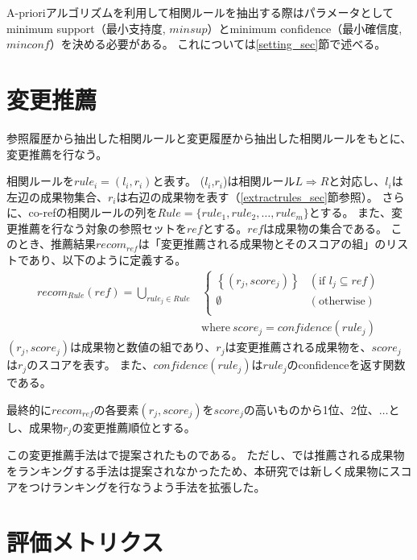 \documentclass[a4paper]{jsbook}
\def\Ra{\Rightarrow}
\newcommand{\minconf}{mincon\!f}
\newcommand{\confidence}{con\!f\!idence}
\begin{document}
A-prioriアルゴリズムを利用して相関ルールを抽出する際はパラメータとしてminimum support（最小支持度, $minsup$）とminimum confidence（最小確信度, $\minconf$）を決める必要がある。
これについては\ref{setting_sec}節で述べる。

\section{変更推薦}\label{ranking_sec}
参照履歴から抽出した相関ルールと変更履歴から抽出した相関ルールをもとに、変更推薦を行なう。

相関ルールを$rule_i = (l_i,r_i)$と表す。
($l_i$,$r_i$)は相関ルール$L \Ra R$と対応し、$l_i$は左辺の成果物集合、$r_i$は右辺の成果物を表す（\ref{extractrules_sec}節参照）。
さらに、co-refの相関ルールの列を$Rule = \{rule_1, rule_2, \dots, rule_m\}$とする。
また、変更推薦を行なう対象の参照セットを$ref$とする。$ref$は成果物の集合である。
このとき、推薦結果$recom_{ref}$は「変更推薦される成果物とそのスコアの組」のリストであり、以下のように定義する。
\begin{eqnarray}
  recom_{Rule}\left(ref\right) = \bigcup_{rule_j \in Rule}
    &\left\{
    \begin{array}{ll}
      \left\{\left(r_j,score_j \right)\right\} &(\textrm{if~} l_j \subseteq ref) \\
      \emptyset &(\textrm{otherwise})\\
    \end{array}
    \right.\\
    &\textrm{where}~score_j = \confidence(rule_j)\nonumber
\end{eqnarray}
$\left(r_j,score_j\right)$は成果物と数値の組であり、$r_j$は変更推薦される成果物を、$score_j$は$r_j$のスコアを表す。
また、$\confidence(rule_j)$は$rule_j$のconfidenceを返す関数である。

最終的に$recom_{ref}$の各要素$(r_j,score_j)$を$score_j$の高いものから1位、2位、$\dots$とし、成果物$r_j$の変更推薦順位とする。

この変更推薦手法は\cite{Zimmermann:2005}で提案されたものである。
ただし、\cite{Zimmermann:2005}では推薦される成果物をランキングする手法は提案されなかったため、本研究では新しく成果物にスコアをつけランキングを行なうよう手法を拡張した。
\section{評価メトリクス}\label{metrics_sec}

\end{document}
